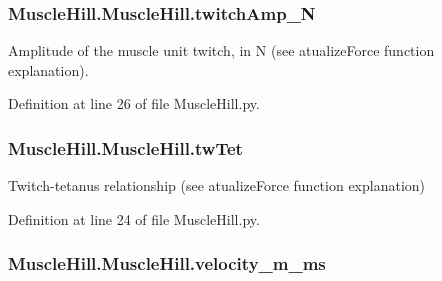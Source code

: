 \subsubsection[{\texorpdfstring{twitch\+Amp\+\_\+N}{twitchAmp_N}}]{\setlength{\rightskip}{0pt plus 5cm}Muscle\+Hill.\+Muscle\+Hill.\+twitch\+Amp\+\_\+N}\hypertarget{class_muscle_hill_1_1_muscle_hill_ae53fd1d4eec68f1de4285211b73e1a13}{}\label{class_muscle_hill_1_1_muscle_hill_ae53fd1d4eec68f1de4285211b73e1a13}


Amplitude of the muscle unit twitch, in N (see atualize\+Force function explanation). 



Definition at line 26 of file Muscle\+Hill.\+py.

\subsubsection[{\texorpdfstring{tw\+Tet}{twTet}}]{\setlength{\rightskip}{0pt plus 5cm}Muscle\+Hill.\+Muscle\+Hill.\+tw\+Tet}\hypertarget{class_muscle_hill_1_1_muscle_hill_a9a5c6c65e918348944a07659d0ca8c98}{}\label{class_muscle_hill_1_1_muscle_hill_a9a5c6c65e918348944a07659d0ca8c98}


Twitch-\/tetanus relationship (see atualize\+Force function explanation) 



Definition at line 24 of file Muscle\+Hill.\+py.

\subsubsection[{\texorpdfstring{velocity\+\_\+m\+\_\+ms}{velocity_m_ms}}]{\setlength{\rightskip}{0pt plus 5cm}Muscle\+Hill.\+Muscle\+Hill.\+velocity\+\_\+m\+\_\+ms}\hypertarget{class_muscle_hill_1_1_muscle_hill_a76789511bcadf11f1aa14d33a6338461}{}\label{class_muscle_hill_1_1_muscle_hill_a76789511bcadf11f1aa14d33a6338461}


